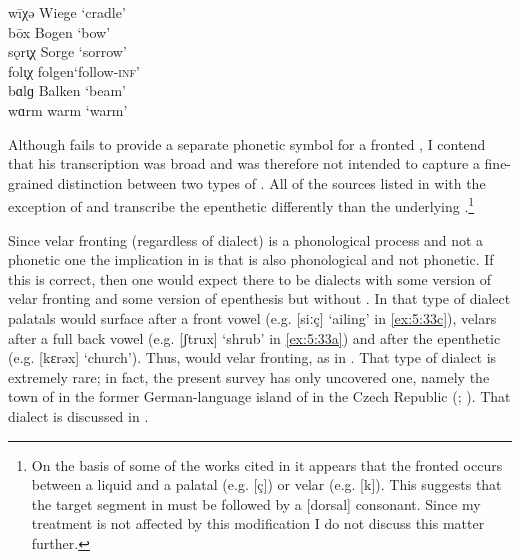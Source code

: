 \ea\label{ex:5:40}
\ea\label{ex:5:40a}     wīχǝ   \tab [viːçǝ]  \tab   Wiege  \tab ‘cradle’     \\
\ex\label{ex:5:40b}     bōx    \tab [boːx]   \tab   Bogen  \tab ‘bow’        \\
\ex\label{ex:5:40c}     sǫrɩ̣χ \tab  [sɔrə̟ç]\tab    Sorge \tab   ‘sorrow’ \\
                        folɩ̣χ \tab  [folə̟ç]\tab    folgen\tab   ‘follow-\textsc{inf}’   \\
\ex\label{ex:5:40d}     bɑlɡ   \tab [bɑlg]   \tab  Balken  \tab ‘beam’   \\
                        wɑrm   \tab [vɑrm]   \tab  warm    \tab ‘warm’   \\
\z 
\z 

Although \citet{Hommer1910} fails to provide a separate phonetic symbol for a fronted , I contend that his transcription was broad and was therefore not intended to capture a fine-grained distinction between two types of . All of the sources listed in  with the exception of \citet{Münch19041970} and \citet{Greferath1922} transcribe the epenthetic  differently than the underlying .\footnote{On the basis of some of the works cited in  it appears that the fronted  occurs between a liquid and a palatal (e.g. [ç]) or velar (e.g. [k]). This suggests that the target segment in  must be followed by a [dorsal] consonant. Since my treatment is not affected by this modification I do not discuss this matter further.}

Since velar fronting (regardless of dialect) is a phonological process and not a phonetic one the implication in  is that  is also phonological and not phonetic. If this is correct, then one would expect there to be dialects with some version of velar fronting and some version of  epenthesis but without . In that type of dialect palatals would surface after a front vowel (e.g. [siːç] ‘ailing’ in \ref{ex:5:33c}), velars after a full back vowel (e.g. [ʃtrux] ‘shrub’ in \ref{ex:5:33a}) and after the epenthetic  (e.g. [kɛrǝx] ‘church’). Thus,  would  velar fronting, as in . That type of dialect is extremely rare; in fact, the present survey has only uncovered one, namely the town of  in the former German-language island of  in the Czech Republic (\citealt{Janiczek1911}; ). That dialect is discussed in .

